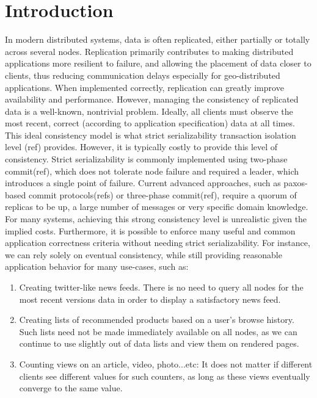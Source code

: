 

\section{Introduction}

In modern distributed systems, data is often replicated, either partially or totally 
across several nodes. Replication primarily contributes to making distributed 
applications more resilient to failure, and allowing the placement of data closer to clients, 
thus reducing communication delays especially for geo-distributed applications. 
When implemented correctly, replication can greatly improve availability and performance.
However, managing the consistency of replicated data is a well-known, nontrivial
problem. Ideally, all clients must observe the most recent, correct (according to
application specification) data at all times. This ideal consistency model is what
strict serializability transaction isolation level (ref) provides. However, it
is typically costly to provide this level of consistency.  Strict
serializability is commonly implemented using two-phase commit(ref), which does not
tolerate node failure and required a leader, which introduces a single point of
failure. Current advanced
approaches, such as paxos-based commit protocols(refs) or three-phase commit(ref),
require a quorum of replicas to be up, a large number of messages or very
specific domain knowledge. \\  %

For many systems, achieving this strong consistency level is unrealistic given
the implied costs. Furthermore, it is possible to enforce many useful and common
application correctness criteria without needing strict serializability. 
For instance, we can rely solely on eventual consistency, while still providing
reasonable application behavior for many use-cases, such as:

\begin{enumerate}
\item Creating twitter-like news feeds. There is no need to query all nodes for
the most recent versions data in order to display a satisfactory news feed.

\item Creating lists of recommended products based on a user's browse history.
Such lists need not be made immediately available on all nodes, as we can
continue to use slightly out of data lists and view them on rendered pages.

\item Counting views on an article, video, photo...etc: It does not matter if
different clients see different values for such counters, as long as these
views eventually converge to the same value.
\end{enumerate}

